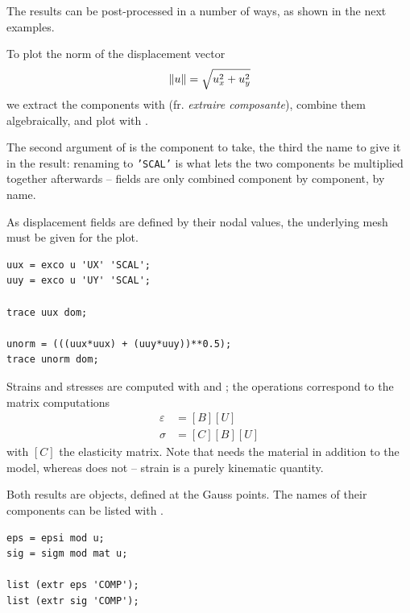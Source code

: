 \noindent The results can be post-processed in a number of ways, as shown in
the next examples.

\begin{castemcom}
To plot the norm of the displacement vector
\[ \lVert u\rVert=\sqrt{u_{x}^{2}+u_{y}^{2}} \]
we extract the components with  
(fr. \emph{extraire composante}), combine them algebraically, and plot with
.

The second argument of  is the component to take, the third the name
to give it in the result: renaming to \texttt{'SCAL'} is what lets the two
components be multiplied together afterwards -- fields are only combined
component by component, by name.

As displacement fields are defined by their nodal values, the underlying mesh
must be given for the plot.
\end{castemcom}
\begin{castemlines}
\begin{verbatim}
uux = exco u 'UX' 'SCAL';
uuy = exco u 'UY' 'SCAL';

trace uux dom;

unorm = (((uux*uux) + (uuy*uuy))**0.5);
trace unorm dom;
\end{verbatim}
\end{castemlines}

\begin{castemcom}
Strains and stresses are computed with 
 and  ; the
operations correspond to the matrix computations
\begin{align}
\varepsilon &= [B][U] \\
\sigma      &= [C][B][U]
\end{align}
with $[C]$ the elasticity matrix. Note that  needs the material in
addition to the model, whereas  does not -- strain is a purely
kinematic quantity.

Both results are  objects, defined at the Gauss points. The names
of their components can be listed with .
\end{castemcom}
\begin{castemlines}
\begin{verbatim}
eps = epsi mod u;
sig = sigm mod mat u;

list (extr eps 'COMP');
list (extr sig 'COMP');
\end{verbatim}
\end{castemlines}

